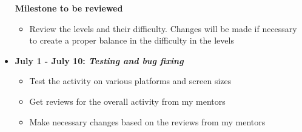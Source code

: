 \documentclass[preprint,12pt]{elsarticle}
\begin{document}
\begin{itemize}
\textbf{Milestone to be reviewed}
\begin{itemize}
\item Review the levels and their difficulty. Changes will be made if necessary to create a proper balance in the difficulty in the levels
\end{itemize}

\item \textbf{July 1 - July 10: \textit{Testing and bug fixing}}
\begin{itemize}
\item Test the activity on various platforms and screen sizes
\item Get reviews for the overall activity from my mentors
\item Make necessary changes based on the reviews from my mentors
\end{itemize}

\end{itemize}
\end{document}
